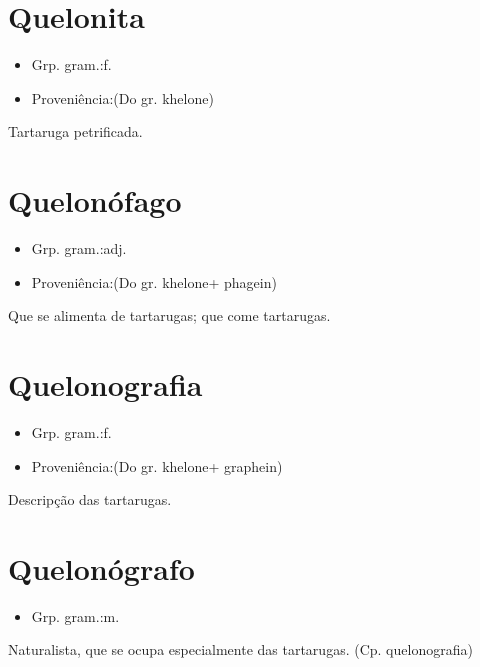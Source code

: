 \section{Quelonita}
\begin{itemize}
\item {Grp. gram.:f.}
\end{itemize}
\begin{itemize}
\item {Proveniência:(Do gr. \textunderscore khelone\textunderscore )}
\end{itemize}
Tartaruga petrificada.
\section{Quelonófago}
\begin{itemize}
\item {Grp. gram.:adj.}
\end{itemize}
\begin{itemize}
\item {Proveniência:(Do gr. \textunderscore khelone\textunderscore  + \textunderscore phagein\textunderscore )}
\end{itemize}
Que se alimenta de tartarugas; que come tartarugas.
\section{Quelonografia}
\begin{itemize}
\item {Grp. gram.:f.}
\end{itemize}
\begin{itemize}
\item {Proveniência:(Do gr. \textunderscore khelone\textunderscore  + \textunderscore graphein\textunderscore )}
\end{itemize}
Descripção das tartarugas.
\section{Quelonógrafo}
\begin{itemize}
\item {Grp. gram.:m.}
\end{itemize}
Naturalista, que se ocupa especialmente das tartarugas.
(Cp. \textunderscore quelonografia\textunderscore )

